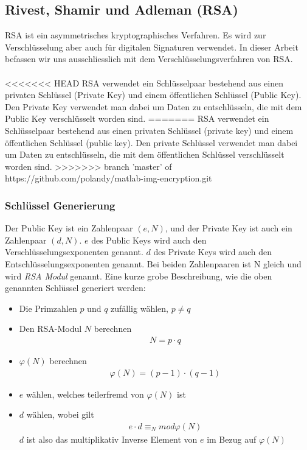 \documentclass[paper=a4,fontsize=12pt]{scrartcl}
\begin{document}
\subsection{Rivest, Shamir und Adleman (RSA)} \label{RSA-intro}
RSA ist ein asymmetrisches kryptographisches Verfahren. Es wird zur Verschlüsselung aber auch für digitalen Signaturen verwendet.
In dieser Arbeit befassen wir uns ausschliesslich mit dem Verschlüsselungsverfahren von RSA.
\\ \\
<<<<<<< HEAD
RSA verwendet ein Schlüsselpaar bestehend aus einen privaten Schlüssel (Private Key) und einem öffentlichen Schlüssel  (Public Key).
Den Private Key verwendet man dabei um Daten zu entschlüsseln, die mit dem Public Key verschlüsselt worden sind. 
=======
RSA verwendet ein Schlüsselpaar bestehend aus einen privaten Schlüssel (private key) und einem öffentlichen Schlüssel  (public key).
Den private Schlüssel verwendet man dabei um Daten zu entschlüsseln, die mit dem öffentlichen Schlüssel verschlüsselt worden sind. 
>>>>>>> branch 'master' of https://github.com/polandy/matlab-img-encryption.git

\subsubsection{Schlüssel Generierung}
Der Public Key ist ein Zahlenpaar $(e,N)$, und der Private Key ist auch ein Zahlenpaar $(d,N)$.
$e$ des Public Keys wird auch den Verschlüsselungsexponenten genannt.
$d$ des Private Keys wird auch den Entschlüsselungsexponenten genannt. 
Bei beiden Zahlenpaaren ist N gleich und wird \textit{RSA Modul} genannt.
Eine kurze grobe Beschreibung, wie die oben genannten Schlüssel generiert werden:
\begin{itemize}
  \item Die Primzahlen $p$ und $q$ zufällig wählen, $p \neq q$
  \item Den RSA-Modul $N$ berechnen \begin{align} N = p \cdot q \end{align}
  \item $\varphi(N)$ berechnen \begin{align} \varphi(N) = (p-1) \cdot (q-1)\end{align}
  \item $e$ wählen, welches teilerfremd von $\varphi(N)$ ist
  \item $d$ wählen, wobei gilt \begin{align} e \cdot d \equiv_N mod \varphi(N)\end{align} $d$ ist also das multiplikativ Inverse Element von $e$ im Bezug auf $\varphi(N)$
\end{itemize}
\end{document}
